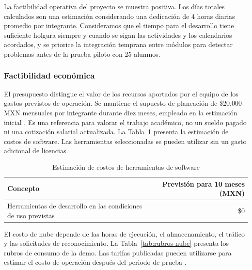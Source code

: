La factibilidad operativa del proyecto se muestra positiva. Los días totales calculados son una estimación considerando una dedicación de 4 horas diarias promedio por integrante. Consideramos que el tiempo para el desarrollo tiene suficiente holgura siempre y cuando se sigan las actividades y los calendarios acordados, y se priorice la integración temprana entre módulos para detectar problemas antes de la prueba piloto con 25 alumnos.
 
\subsubsection{Factibilidad económica}

El presupuesto distingue el valor de los recursos aportados por el equipo de los gastos previstos de operación. Se mantiene el supuesto de planeación de \$20{,}000 MXN mensuales por integrante durante diez meses, empleado en la estimación inicial \cite{occmundial2025salarios}. Es una referencia para valorar el trabajo académico, no un sueldo pagado ni una cotización salarial actualizada. La Tabla~\ref{tab:costos-software} presenta la estimación de costos de software. Las herramientas seleccionadas se pueden utilizar sin un gasto adicional de licencias.

\begin{table}[H]
\centering
\caption{Estimación de costos de herramientas de software}
\label{tab:costos-software}
\begin{tabularx}{\textwidth}{|X|r|}
\hline
\textbf{Concepto} & \textbf{Previsión para 10 meses (MXN)} \\ \hline
Herramientas de desarrollo en las condiciones de uso previstas & \$0 \\ \hline
\end{tabularx}
\end{table}

El costo de nube depende de las horas de ejecución, el almacenamiento, el tráfico y las solicitudes de reconocimiento. La Tabla~\ref{tab:rubros-nube} presenta los rubros de consumo de la demo. Las tarifas publicadas pueden utilizarse para estimar el costo de operación después del periodo de prueba \cite{gcpComputeEngine,googlevisionPricing}.


